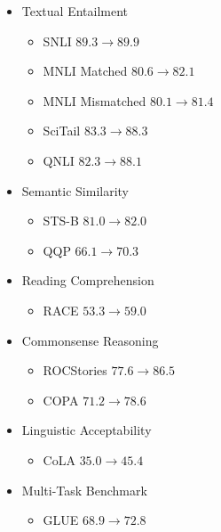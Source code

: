 \documentclass[9pt]{beamer}
\begin{document}
\begin{frame}
  \begin{itemize}
  \item Textual Entailment
    \begin{itemize}
      \footnotesize
    \item SNLI $89.3 \rightarrow 89.9$
    \item MNLI Matched $80.6 \rightarrow 82.1$
    \item MNLI Mismatched $80.1 \rightarrow 81.4$
    \item SciTail $83.3 \rightarrow 88.3$
    \item QNLI $82.3 \rightarrow 88.1 $
    \end{itemize}
    \smallskip
  \item Semantic Similarity
    \begin{itemize}
      \footnotesize
    \item STS-B $81.0 \rightarrow 82.0$
    \item QQP $66.1 \rightarrow 70.3$
    \end{itemize}
    \smallskip
  \item Reading Comprehension
    \begin{itemize}
      \footnotesize
    \item RACE $53.3 \rightarrow 59.0$
    \end{itemize}
    \smallskip
  \item Commonsense Reasoning
    \begin{itemize}
      \footnotesize
    \item ROCStories $77.6 \rightarrow 86.5$
    \item COPA $71.2 \rightarrow 78.6$
    \end{itemize}
    \smallskip
  \item Linguistic Acceptability
    \begin{itemize}
      \footnotesize
      \item CoLA $35.0 \rightarrow 45.4$
    \end{itemize}
    \smallskip
  \item Multi-Task Benchmark
    \begin{itemize}
      \footnotesize
      \item GLUE $68.9 \rightarrow 72.8$
    \end{itemize}
  \end{itemize}

\end{frame}
\end{document}
